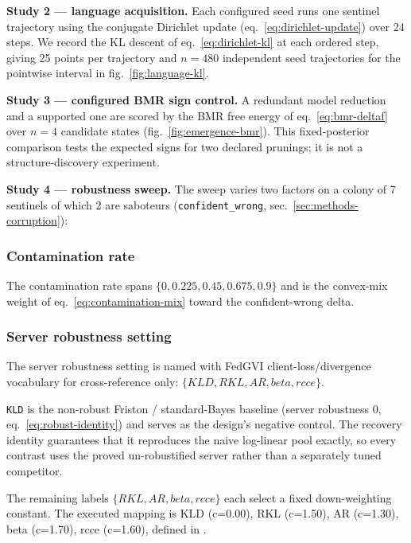 \documentclass[
  english,
]{article}
\theoremstyle{plain}
\theoremstyle{definition}
\theoremstyle{remark}
\theoremstyle{definition}
\begin{document}
\textbf{Study 2 --- language acquisition.} Each configured seed runs one
sentinel trajectory using the conjugate Dirichlet update
(eq.~\ref{eq:dirichlet-update}) over 24 steps. We record the KL descent
of eq.~\ref{eq:dirichlet-kl} at each ordered step, giving 25 points per
trajectory and \(n =
480\) independent seed trajectories for the pointwise interval in
fig.~\ref{fig:language-kl}.

\textbf{Study 3 --- configured BMR sign control.} A redundant model
reduction and a supported one are scored by the BMR free energy of
eq.~\ref{eq:bmr-deltaf} over \(n = 4\) candidate states
(fig.~\ref{fig:emergence-bmr}). This fixed-posterior comparison tests
the expected signs for two declared prunings; it is not a
structure-discovery experiment.

\textbf{Study 4 --- robustness sweep.} The sweep varies two factors on a
colony of 7 sentinels of which 2 are saboteurs
(\texttt{confident\_wrong}, sec.~\ref{sec:methods-corruption}):

\subsubsection{Contamination rate}\label{contamination-rate}

The contamination rate spans \(\{0, 0.225, 0.45, 0.675, 0.9\}\) and is
the convex-mix weight of eq.~\ref{eq:contamination-mix} toward the
confident-wrong delta.

\subsubsection{Server robustness
setting}\label{server-robustness-setting}

The server robustness setting is named with FedGVI
client-loss/divergence vocabulary for cross-reference only:
\(\{KLD, RKL, AR, beta, rcce\}\).

\texttt{KLD} is the non-robust Friston / standard-Bayes baseline (server
robustness 0, eq.~\ref{eq:robust-identity}) and serves as the design's
negative control. The recovery identity guarantees that it reproduces
the naive log-linear pool exactly, so every contrast uses the proved
un-robustified server rather than a separately tuned competitor.

The remaining labels \(\{RKL, AR, beta, rcce\}\) each select a fixed
 down-weighting constant. The executed mapping
is KLD (c=0.00), RKL (c=1.50), AR (c=1.30), beta (c=1.70), rcce
(c=1.60), defined in .
\end{document}
